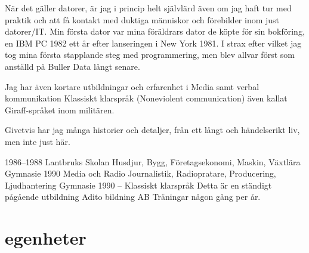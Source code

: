 \documentclass[]{cv-style}          %
\begin{document}
När det gäller datorer, är jag i princip helt självlärd även om jag haft
tur med praktik och att få kontakt med duktiga människor och förebilder
inom just datorer/IT. Min första dator var mina föräldrars dator de köpte
för sin bokföring, en IBM PC 1982 ett år efter lanseringen i New York 1981.
I strax efter vilket jag tog mina första stapplande steg med programmering,
men blev allvar först som anställd på Buller Data långt senare.

Jag har även kortare utbildningar och erfarenhet i Media samt verbal 
kommunikation Klassiskt klarspråk (Noneviolent communication) även kallat
Giraff-språket inom militären.

Givetvis har jag många historier och detaljer, från ett långt och 
händelserikt liv, men inte just här.
\begin{entrylist}
\entry
{1986--1988}
{Lantbruks Skolan {\normalfont Husdjur, Bygg, Företagsekonomi, Maskin, Växtlära }}
{Gymnasie}
{\vspace{-0.80cm}}
\entry
{1990}
{Media och Radio {\normalfont Journalistik, Radiopratare, Producering, 
Ljudhantering}}
{Gymnasie}
{\vspace{-0.8cm}}
\entry
{1990 -- }
{Klassiskt klarspråk {\normalfont Detta är en ständigt pågående utbildning}}
{Adito bildning AB}
{Träningar någon gång per år.}
{\vspace{-0.5cm}}
\end{entrylist}


\section{egenheter}
\end{document}
